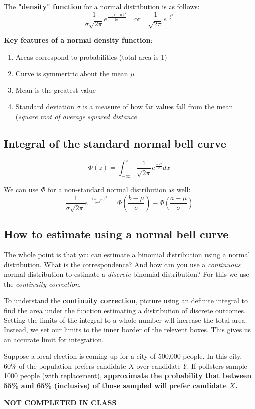 \documentclass[titlepage, 12pt, leqno]{article}
\begin{document}
The \textbf{"density" function} for a normal distribution is as follows:
\[
\frac{1}{\sigma\sqrt{2\pi }}e^{\frac{-(x-\mu)^2}{2\sigma^2}} \quad \text{or} \quad \frac{1}{\sqrt{2\pi }} e^{\frac{-x^2}{2}}
\]

\textbf{Key features of a normal density function}:
\begin{enumerate}
    \item Areas correspond to probabilities (total area is 1)
    \item Curve is symmertric about the mean $\mu$ 
    \item Mean is the greatest value
    \item Standard deviation $\sigma$ is a measure of how far values fall from the mean (\textit{square root of average squared distance} 
\end{enumerate}

\subsection{Integral of the standard normal bell curve}
\[
    \Phi(z) = \int_{-\infty}^{z}\frac{1}{\sqrt{2\pi}} e^{\frac{-x^2}{2}} dx
\]

We can use $\Phi$ for a non-standard normal distribution as well:
\[
\frac{1}{\sigma\sqrt{2\pi }}e^{\frac{-(x-\mu)^2}{2\sigma^2}} = \Phi\left(\frac{b-\mu}{\sigma}\right) - \Phi\left(\frac{a-\mu}{\sigma}\right) 
\]
\subsection{How to estimate using a normal bell curve}
The whole point is that you can estimate a binomial distribution using a normal distribution. What is the correspondence? And how can you use a \textit{continuous} normal distribution to estimate a \textit{discrete} binomial distribution? For this we use the \textit{continuity correction}. 

\begin{definition}
    To understand the \textbf{continuity correction}, picture using an definite integral to find the area under the function estimating a distribution of discrete outcomes. Setting the limits of the integral to a whole number will increase the total area. Instead, we set our limits to the inner border of the relevent boxes. This gives us an accurate limit for integration.
\end{definition}

\begin{ex}
    Suppose a local election is coming up for a city of 500,000 people. In this city, 60\% of the population prefers candidate $X$ over candidate $Y$. If pollsters sample 1000 people (with replacement), \textbf{approximate the probability that between 55\% and 65\% (inclusive) of those sampled will prefer candidate $X$.} 

    \textbf{NOT COMPLETED IN CLASS} 
\end{ex}
\end{document}
